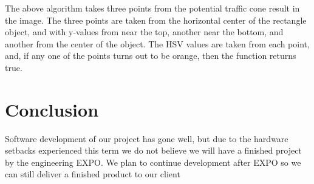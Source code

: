 \documentclass[10pt,letterpaper,onecolumn,draftclsnofoot,journal]{IEEEtran}
\begin{document}
\par
The above algorithm takes three points from the potential traffic cone result in the image. The three points are taken from the horizontal center of the rectangle object, and with y-values from near the top, another near the bottom, and another from the center of the object. The HSV values are taken from each point, and, if any one of the points turns out to be orange, then the function returns true.

\section{Conclusion}
Software development of our project has gone well, but due to the hardware setbacks experienced this term we do not believe we will have a finished project by the engineering EXPO. We plan to continue development after EXPO so we can still deliver a finished product to our client



%
%
\end{document}
